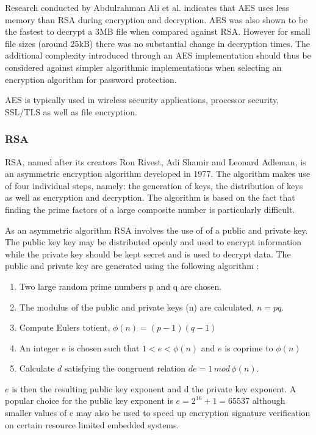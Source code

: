 Research conducted by Abdulrahman Ali et al. \cite{aes_second} indicates that AES uses less memory than RSA during encryption and decryption. AES was also shown to be the fastest to decrypt a 3MB file when compared against RSA. However for small file sizes (around 25kB) there was no substantial change in decryption times. The additional complexity introduced through an AES implementation should thus be considered against simpler algorithmic implementations when selecting an encryption algorithm for password protection. 

AES is typically used in wireless security applications, processor security, SSL/TLS as well as file encryption.

\subsubsection{RSA}
RSA, named after its creators Ron Rivest, Adi Shamir and Leonard Adleman, is an asymmetric encryption algorithm developed in 1977. The algorithm makes use of four individual steps, namely: the generation of keys, the distribution of keys as well as encryption and decryption. The algorithm is based on the fact that finding the prime factors of a large composite number is particularly difficult.

As an asymmetric algorithm RSA involves the use of of a public and private key. The public key key may be distributed openly and used to encrypt information while the private key should be kept secret and is used to decrypt data. The public and private key are generated using the following algorithm \cite{encryption_standards}:

\begin{enumerate}
  \item Two large random prime numbers p and q are chosen.
  \item The modulus of the public and private keys (n) are calculated, $ n = pq $.
  \item Compute Eulers totient, $ \phi(n) = (p-1)(q-1) $ 
   \item An integer $ e $ is chosen such that $ 1 < e < \phi(n) $ and $e$ is coprime to $\phi(n)$
   \item Calculate $d $ satisfying the congruent relation $de = 1\,mod\, \phi(n)$.
  \end{enumerate}

$e$ is then the resulting public key exponent and d the private key exponent. A popular choice for the public key exponent is $e = 2^{16} + 1 = 65537$ although smaller values of e may also be used to speed up encryption signature verification \cite{rsakey} on certain resource limited embedded systems.

